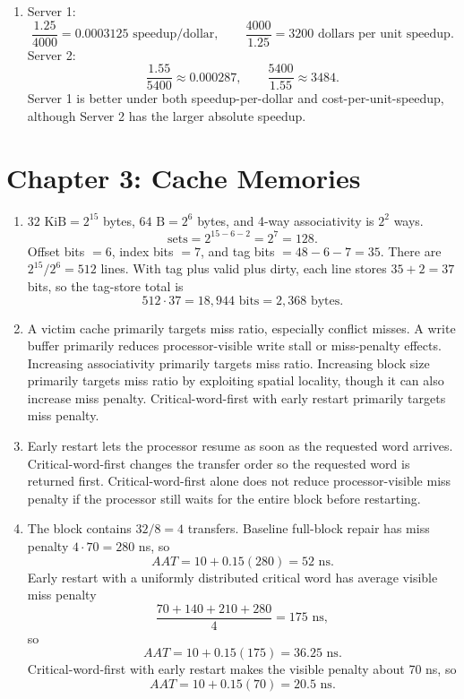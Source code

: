 \documentclass[11pt]{article}
\begin{document}
\begin{enumerate}
    \item Server 1:
    \[
        \frac{1.25}{4000}=0.0003125\text{ speedup/dollar},\qquad
        \frac{4000}{1.25}=3200\text{ dollars per unit speedup}.
    \]
    Server 2:
    \[
        \frac{1.55}{5400}\approx0.000287,\qquad
        \frac{5400}{1.55}\approx3484.
    \]
    Server 1 is better under both speedup-per-dollar and cost-per-unit-speedup, although Server 2 has the larger absolute speedup.
\end{enumerate}

\section{Chapter 3: Cache Memories}
\begin{enumerate}
    \item \(32\text{ KiB}=2^{15}\) bytes, \(64\text{ B}=2^6\) bytes, and 4-way associativity is \(2^2\) ways.
    \[
        \text{sets}=2^{15-6-2}=2^7=128.
    \]
    Offset bits \(=6\), index bits \(=7\), and tag bits \(=48-6-7=35\).
    There are \(2^{15}/2^6=512\) lines.
    With tag plus valid plus dirty, each line stores \(35+2=37\) bits, so the tag-store total is
    \[
        512\cdot37=18{,}944\text{ bits}=2{,}368\text{ bytes}.
    \]

    \item A victim cache primarily targets miss ratio, especially conflict misses.
    A write buffer primarily reduces processor-visible write stall or miss-penalty effects.
    Increasing associativity primarily targets miss ratio.
    Increasing block size primarily targets miss ratio by exploiting spatial locality, though it can also increase miss penalty.
    Critical-word-first with early restart primarily targets miss penalty.

    \item Early restart lets the processor resume as soon as the requested word arrives.
    Critical-word-first changes the transfer order so the requested word is returned first.
    Critical-word-first alone does not reduce processor-visible miss penalty if the processor still waits for the entire block before restarting.

    \item The block contains \(32/8=4\) transfers.
    Baseline full-block repair has miss penalty \(4\cdot70=280\) ns, so
    \[
        AAT=10+0.15(280)=52\text{ ns}.
    \]
    Early restart with a uniformly distributed critical word has average visible miss penalty
    \[
        \frac{70+140+210+280}{4}=175\text{ ns},
    \]
    so
    \[
        AAT=10+0.15(175)=36.25\text{ ns}.
    \]
    Critical-word-first with early restart makes the visible penalty about 70 ns, so
    \[
        AAT=10+0.15(70)=20.5\text{ ns}.
    \]


\end{enumerate}
\end{document}
